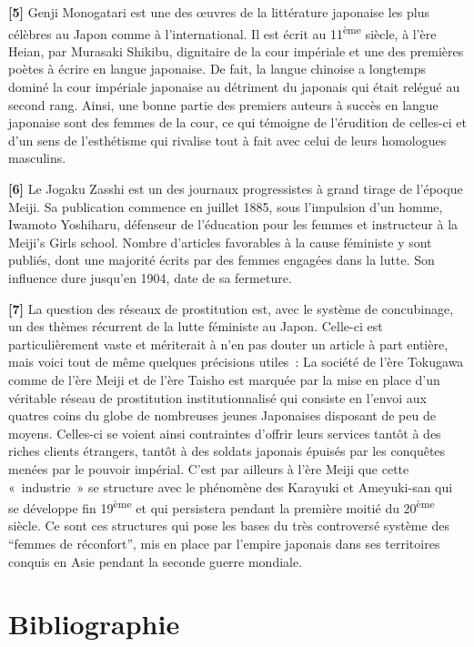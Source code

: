 \documentclass[11pt,a4paper]{article}
\begin{document}
\textbf{{[}5{]}} Genji Monogatari est une des œuvres de la littérature japonaise les plus célèbres au Japon comme à l’international. Il est écrit au 11\textsuperscript{ème} siècle, à l’ère Heian, par Murasaki Shikibu, dignitaire de la cour impériale et une des premières poètes à écrire en langue japonaise. De fait, la langue chinoise a longtemps dominé la cour impériale japonaise au détriment du japonais qui était relégué au second rang. Ainsi, une bonne partie des premiers auteurs à succès en langue japonaise sont des femmes de la cour, ce qui témoigne de l’érudition de celles-ci et d’un sens de l’esthétisme qui rivalise tout à fait avec celui de leurs homologues masculins.

\textbf{{[}6{]}} Le Jogaku Zasshi est un des journaux progressistes à grand tirage de l’époque Meiji. Sa publication commence en juillet 1885, sous l’impulsion d’un homme, Iwamoto Yoshiharu, défenseur de l’éducation pour les femmes et instructeur à la Meiji’s Girls school. Nombre d’articles favorables à la cause féministe y sont publiés, dont une majorité écrits par des femmes engagées dans la lutte. Son influence dure jusqu’en 1904, date de sa fermeture.

\textbf{{[}7{]}} La question des réseaux de prostitution est, avec le système de concubinage, un des thèmes récurrent de la lutte féministe au Japon. Celle-ci est particulièrement vaste et mériterait à n’en pas douter un article à part entière, mais voici tout de même quelques précisions utiles~: La société de l’ère Tokugawa comme de l’ère Meiji et de l’ère Taisho est marquée par la mise en place d’un véritable réseau de prostitution institutionnalisé qui consiste en l’envoi aux quatres coins du globe de nombreuses jeunes Japonaises disposant de peu de moyens. Celles-ci se voient ainsi contraintes d’offrir leurs services tantôt à des riches clients étrangers, tantôt à des soldats japonais épuisés par les conquêtes menées par le pouvoir impérial. C’est par ailleurs à l’ère Meiji que cette «~industrie~» se structure avec le phénomène des Karayuki et Ameyuki-san qui se développe fin 19\textsuperscript{ème} et qui persistera pendant la première moitié du 20\textsuperscript{ème} siècle. Ce sont ces structures qui pose les bases du très controversé système des “femmes de réconfort”, mis en place par l’empire japonais dans ses territoires conquis en Asie pendant la seconde guerre mondiale.

\section{Bibliographie}
\small
\end{document}
